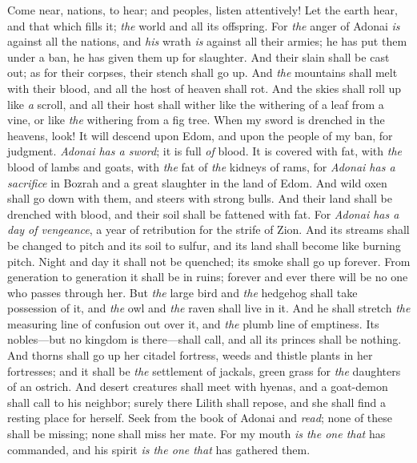 \begin{biblechapter} %
 Come near, nations, to hear; 
and peoples, listen attentively! 
Let the earth hear, and that which fills it; 
\textit{the} world and all its offspring.
\verse For \textit{the} anger of Adonai \textit{is} against all the nations, 
and \textit{his} wrath \textit{is} against all their armies; 
he has put them under a ban, 
he has given them up for slaughter.
\verse And their slain shall be cast out; 
as for their corpses, their stench shall go up. 
And \textit{the} mountains shall melt with their blood,
\verse and all the host of heaven shall rot. 
And the skies shall roll up like \textit{a} scroll, 
and all their host shall wither 
like the withering of a leaf from a vine, 
or like \textit{the} withering from a fig tree.
\verse When my sword is drenched in the heavens, look! It will descend upon Edom, 
and upon the people of my ban, for judgment.
\verse \textit{Adonai has a sword};
\verse it is full \textit{of} blood. 
It is covered with fat, 
with \textit{the} blood of lambs and goats, 
with \textit{the} fat of \textit{the} kidneys of rams, 
for \textit{Adonai has a sacrifice} in Bozrah 
and a great slaughter in the land of Edom.
\verse And wild oxen shall go down with them, 
and steers with strong bulls. 
And their land shall be drenched with blood, 
and their soil shall be fattened with fat.
\verse For \textit{Adonai has a day of vengeance}, 
a year of retribution for the strife of Zion.
\verse And its streams shall be changed to pitch and its soil to sulfur, 
and its land shall become like burning pitch.
\verse Night and day it shall not be quenched; 
its smoke shall go up forever. 
From generation to generation it shall be in ruins; 
forever and ever there will be no one who passes through her.
\verse But \textit{the} large bird and \textit{the} hedgehog shall take possession of it, 
and \textit{the} owl and \textit{the} raven shall live in it. 
And he shall stretch \textit{the} measuring line of confusion out over it, 
and \textit{the} plumb line of emptiness.
\verse Its nobles—but no kingdom is there—shall call, 
and all its princes shall be nothing.
\verse And thorns shall go up her citadel fortress, 
weeds and thistle plants in her fortresses; 
and it shall be \textit{the} settlement of jackals, 
green grass for \textit{the} daughters of an ostrich.
\verse And desert creatures shall meet with hyenas, 
and a goat-demon shall call to his neighbor; 
surely there Lilith shall repose, 
and she shall find a resting place for herself.
\verse Seek from the book of Adonai and \textit{read};
\verse none of these shall be missing; 
none shall miss her mate. 
For my mouth \textit{is the one that} has commanded, 
and his spirit \textit{is the one that} has gathered them.
\end{biblechapter}

